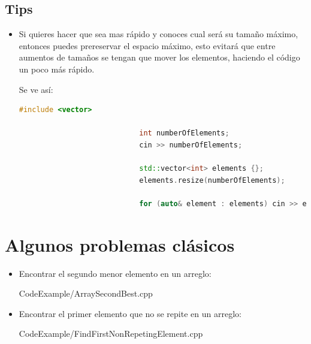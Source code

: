 \documentclass[12pt, fleqn]{report}                             %
\theoremstyle{break}                                            %
\begin{document}
            \subsection{Tips}

                \begin{itemize}
                    \item Si quieres hacer que sea mas rápido y conoces cual será su tamaño máximo,
                        entonces puedes prereservar el espacio máximo, esto evitará que entre aumentos de tamaños
                        se tengan que mover los elementos, haciendo el código un poco más rápido.

                        Se ve así:
                        \begin{lstlisting}[language=C++, gobble=28]
                            #include <vector>

                            int numberOfElements;
                            cin >> numberOfElements;

                            std::vector<int> elements {};
                            elements.resize(numberOfElements);

                            for (auto& element : elements) cin >> element;
                        \end{lstlisting}
                

                \end{itemize}

        
        \clearpage
        \section{Algunos problemas clásicos}

            \begin{itemize}
                \item 
                    Encontrar el segundo menor elemento en un arreglo:
                    
                    {CodeExample/ArraySecondBest.cpp}

                \clearpage

                \item 
                    Encontrar el primer elemento que no se repite en un
                    arreglo:

                    
                    {CodeExample/FindFirstNonRepetingElement.cpp}
            \end{itemize}
\end{document}
